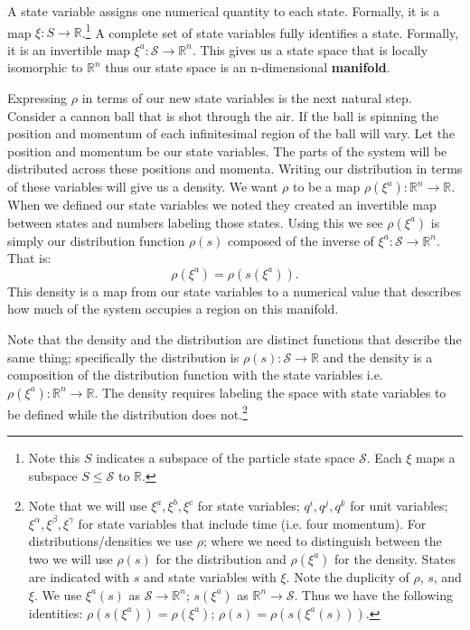 \documentclass{article}
\begin{document}
\begin{defn}
	A state variable assigns one numerical quantity to each state. Formally, it is a map $\xi : S \to \mathbb{R}$.\footnote{Note this $S$ indicates a subspace of the particle state space $\mathcal{S}$. Each $\xi$ maps a subspace  $S \le \mathcal{S}$ to $\mathbb{R}$.} A complete set of state variables fully identifies a state. Formally, it is an invertible  map $\xi^a : \mathcal{S} \rightarrow \mathbb{R}^n $. This gives us a state space that is locally isomorphic to $\mathbb{R}^n$ thus our state space is an n-dimensional \textbf{manifold}.
\end{defn}

		
	Expressing $\rho$ in terms of our new state variables is the next natural step. Consider a cannon ball that is shot through the air. If the ball is spinning the position and momentum of each infinitesimal region of the ball will vary. Let the position and momentum be our state variables. The parts of the system will be distributed across these positions and momenta. Writing our distribution in terms of these variables will give us a density. We want $\rho$ to be a map $\rho(\xi^a): \mathbb{R}^n \to \mathbb{R}$. When we defined our state variables we noted they created an invertible map between states and numbers labeling those states. Using this we see $\rho(\xi^a)$ is simply our distribution function $\rho(s)$ composed of the inverse of $\xi^a: \mathcal{S}\to \mathbb{R}^n$. That is: $$\rho(\xi^a) = \rho(s(\xi^a)).$$ This density is a map from our state variables to a numerical value that describes how much of the system occupies a region on this manifold.
	
	 Note that the density and the distribution are distinct functions that describe the same thing; specifically the distribution is $\rho(s) : \mathcal{S} \to \mathbb{R}$ and the density is a composition of the distribution function with the state variables i.e. $\rho(\xi^a) : \mathbb{R}^n \to \mathbb{R}$. The density requires labeling the space with state variables to be defined while the distribution does not.\footnote{Note that we will use $\xi^a, \xi^b, \xi^c$ for state variables; $q^i, q^j, q^k$ for unit variables; $\xi^\alpha, \xi^\beta, \xi^\gamma$ for state variables that include time (i.e. four momentum). For distributions/densities we use $\rho$; where we need to distinguish between the two we will use $\rho(s)$ for the distribution and $\rho(\xi^a)$ for the density. States are indicated with $s$ and state variables with $\xi$. Note the duplicity of $\rho$, $s$, and $\xi$. We use $\xi^a(s)$ as $\mathcal{S} \to \mathbb{R}^n$; $s(\xi^a)$ as $\mathbb{R}^n \to \mathcal{S}$.
Thus we have the following identities: $\rho(s(\xi^a)) = \rho(\xi^a)$; $\rho(s) = \rho(s (\xi^a(s)))$.}
\end{document}

